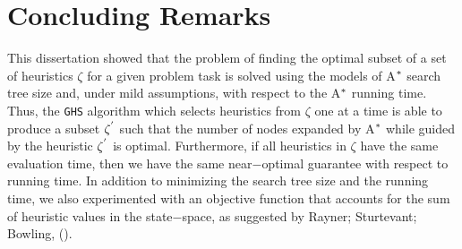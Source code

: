 
 
\chapter{Concluding Remarks}\label{ch:conclusions}

\iffalse
\chapterprecis{The purpose of this section is to introduce the meta-reasoning proposed.}\index{sinopse de capítulo}
\fi

\noindent
This dissertation showed that the problem of finding the optimal subset of a set of heuristics $\zeta$ for a given problem task is solved using the models of A$\sp{*}$ search tree size and, under mild assumptions, with respect to the A$\sp{*}$ running time. Thus, the \texttt{GHS} algorithm which selects heuristics from $\zeta$ one at a time is able to produce a subset $\zeta\sp{'}$ such that the number of nodes expanded by A$\sp{*}$ while guided by the heuristic $\zeta\sp{'}$ is optimal. Furthermore, if all heuristics in $\zeta$ have the same evaluation time, then we have the same near$-$optimal guarantee with respect to running time. In addition to minimizing the search tree size and the running time, we also experimented with an objective function that accounts for the sum of heuristic values in the state$-$space, as suggested by Rayner; Sturtevant; Bowling, (\citeyear{raynersss13}).\\

